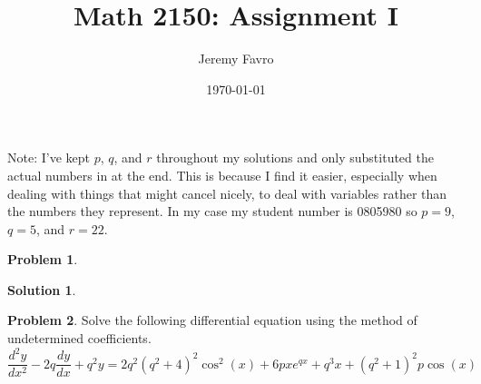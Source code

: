 \documentclass[10pt]{article}
\title{Math 2150: Assignment I}
\author{Jeremy Favro}
\date{\today}
\theoremstyle{definition}
\newtheorem{problem}{Problem}
\newtheorem{soln}{Solution}
\begin{document}
\maketitle
\noindent Note: I've kept $p$, $q$, and $r$ throughout my solutions and only substituted the actual numbers in at the end. This is because I find it easier,
especially when dealing with things that might cancel nicely, to deal with variables rather than the numbers they represent. In my case my 
student number is 0805980 so $p=9$, $q=5$, and $r=22$.
\\
\begin{problem}
\end{problem}
\begin{soln}
\end{soln}
\newpage

\begin{problem}
Solve the following differential equation using the method of undetermined coefficients.
$$\frac{d^2y}{dx^2}-2q\frac{dy}{dx}+q^2y=2q^2\left(q^2+4\right)^2\cos^2\left(x\right)+6pxe^{qx}+q^3x+(q^2+1)^2p\cos\left(x\right)$$
\end{problem}
\end{document}
